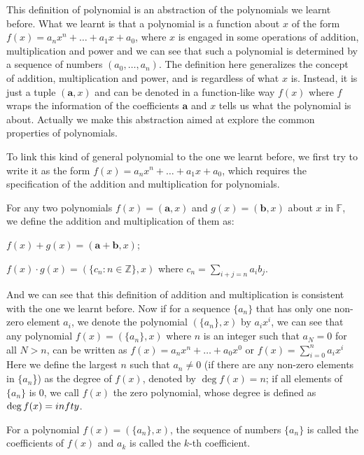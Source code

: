 \documentclass{article}
\begin{document}
\begin{Rmk}{}
    \begin{compactenum}
        \item This definition of polynomial is an abstraction of the polynomials we learnt before. What we learnt is that a polynomial is a function about $x$ of the form $f(x) = a_nx^n+\dots+a_1x+a_0$, where $x$ is engaged in some operations of addition, multiplication and power and we can see that such a polynomial is determined by a sequence of numbers $(a_0, \dots, a_n)$. The definition here generalizes the concept of addition, multiplication and power, and is regardless of what $x$ is. Instead, it is just a tuple $(\pmb{a}, x)$ and can be denoted in a function-like way $f(x)$ where $f$ wraps the information of the coefficients $\pmb{a}$ and $x$ tells us what the polynomial is about. Actually we make this abstraction aimed at explore the common properties of polynomials.
        \item To link this kind of general polynomial to the one we learnt before, we first try to write it as the form $f(x) = a_nx^n + \dots + a_1x + a_0$, which requires the specification of the addition and multiplication for polynomials. \textcolor{Df}{For any two polynomials $f(x) = (\pmb{a}, x)$ and $g(x) = (\pmb{b}, x)$ about $x$ in $\mathbb{F}$, we define the addition and multiplication of them as:
        \begin{compactitem}
            \item $f(x)+g(x) = (\pmb{a}+\pmb{b}, x)$;
            \item $f(x)\cdot g(x) = (\{c_n: n\in\mathbb{Z}\}, x)$ where $c_n = \sum_{i+j = n} a_ib_j$.
        \end{compactitem}}
        And we can see that this definition of addition and multiplication is consistent with the one we learnt before. \textcolor{Th}{Now if for a sequence $\{a_n\}$ that has only one non-zero element $a_i$, we denote the polynomial $(\{a_n\}, x)$ by $a_ix^i$, we can see that any polynomial $f(x) = (\{a_n\}, x)$ where $n$ is an integer such that $a_N=0$ for all $N>n$, can be written as $f(x) = a_nx^n + \dots + a_0x^0$ or $f(x) = \sum_{i=0}^{n} a_ix^i$} \textcolor{Df}{Here we define the largest $n$ such that $a_n\neq 0$ (if there are any non-zero elements in $\{a_n$\}) as the degree of $f(x)$, denoted by $\deg f(x) = n$; if all elements of $\{a_n\}$ is $0$, we call $f(x)$ the zero polynomial, whose degree is defined as $\deg f(x) = \-infty$.}
        \item For a polynomial $f(x) = (\{a_n\}, x)$, the sequence of numbers $\{a_n\}$ is called the coefficients of $f(x)$ and $a_k$ is called the $k$-th coefficient.

\end{compactenum}
\end{Rmk}
\end{document}
